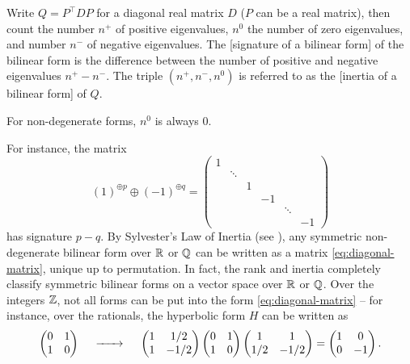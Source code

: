 \begin{definition}
	Write $Q=P^\intercal D P$ for a diagonal real matrix $D$ ($P$ can be a real matrix), then count the number $n^+$ of positive eigenvalues, $n^0$ the number of zero eigenvalues, and number $n^-$ of negative eigenvalues. The [signature of a bilinear form] of the bilinear form is the difference between the number of positive and negative eigenvalues $n^+-n^-$.
	The triple $(n^+, n^-, n^0)$ is referred to as the [inertia of a bilinear form] of $Q$.
\end{definition}

\begin{remark}
	For non-degenerate forms, $n^0$ is always $0$.
\end{remark}

For instance, the matrix
\begin{equation}\label{eq:diagonal-matrix}
	(1)^{\oplus p}\oplus (-1)^{\oplus q} = \begin{pmatrix}
		1 & &&&\\
			&\ddots&&&\\
			&& 1&&\\
			&&&-1 & &\\
			&&&&\ddots&\\
			&&&&& -1
	\end{pmatrix}
\end{equation}
has signature $p-q$. By Sylvester's Law of Inertia (see \cite{lam2005quadratic}), any symmetric non-degenerate bilinear form over $\mathbb{R}$ or $\mathbb{Q}$ can be written as a matrix \cref{eq:diagonal-matrix}, unique up to permutation.
In fact, the rank and inertia completely classify symmetric bilinear forms on a vector space over $\mathbb{R}$ or $\mathbb{Q}$. Over the integers $\mathbb{Z}$, not all forms can be put into the form \cref{eq:diagonal-matrix} -- for instance, over the rationals, the hyperbolic form $H$ can be written as
\begin{equation}\label{eq:hyperbolic-form-transformation}
	\begin{pmatrix} 0 & 1\\ 1 & 0 \end{pmatrix}
	\quad\lkxto\quad
	\begin{pmatrix} 1 & 1/2 \\ 1 & -1/2 \end{pmatrix}
	\begin{pmatrix} 0 & 1 \\ 1 & 0 \end{pmatrix}
	\begin{pmatrix} 1 & 1 \\ 1/2 & -1/2 \end{pmatrix}=
	\begin{pmatrix} 1 & 0 \\ 0 & -1 \end{pmatrix}.
\end{equation}

